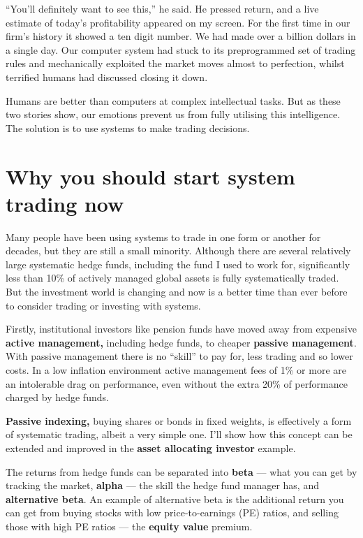 ``You'll definitely want to see this,'' he said. He pressed return, and a live estimate of today's profitability appeared on my screen. For the first time in our firm's history it showed a ten digit number. We had made over a billion dollars in a single day. Our computer system had stuck to its preprogrammed set of trading rules and mechanically exploited the market moves almost to perfection, whilst terrified humans had discussed closing it down.

Humans are better than computers at complex intellectual tasks. But as these two stories show, our emotions prevent us from fully utilising this intelligence. The solution is to use systems to make trading decisions.

\section*{Why you should start system trading now}  {}

Many people have been using systems to trade in one form or another for decades, but they are still a small minority. Although there are several relatively large systematic hedge funds, including the fund I used to work for, significantly less than 10\% of actively managed global assets is fully systematically traded. But the investment world is changing and now is a better time than ever before to consider trading or investing with systems.

Firstly, institutional investors like pension funds have moved away from expensive \textbf{active management,} including hedge funds, to cheaper \textbf{passive management}. With passive management there is no ``skill'' to pay for, less trading and so lower costs. In a low inflation environment active management fees of 1\% or more are an intolerable drag on performance, even without the extra 20\% of performance charged by hedge funds. 

\textbf{Passive indexing,} buying shares or bonds in fixed weights, is effectively a form of systematic trading, albeit a very simple one. I'll show how this concept can be extended and improved in the \textbf{asset allocating investor} example.

The returns from hedge funds can be separated into \textbf{beta} --- what you can get by tracking the market, \textbf{alpha} --- the skill the hedge fund manager has, and \textbf{alternative beta}. An example of alternative beta is the additional return you can get from buying stocks with low price-to-earnings (PE) ratios, and selling those with high PE ratios --- the \textbf{equity value} premium.

